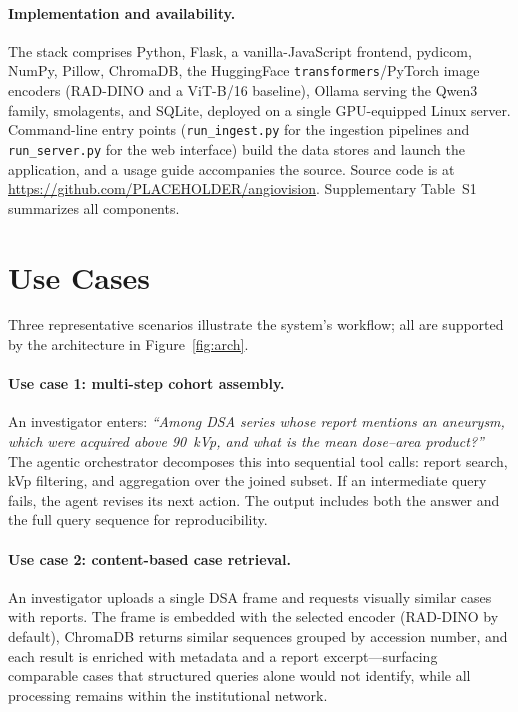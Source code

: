 \documentclass[11pt]{article}
\begin{document}
\paragraph{Implementation and availability.}
The stack comprises Python, Flask, a vanilla-JavaScript frontend, pydicom, NumPy, Pillow, ChromaDB, the HuggingFace
\texttt{transformers}/PyTorch image encoders (RAD-DINO and a ViT-B/16 baseline),
Ollama serving the Qwen3 family, smolagents, and SQLite, deployed on a single
GPU-equipped Linux server. Command-line entry points (\texttt{run\_ingest.py} for
the ingestion pipelines and \texttt{run\_server.py} for the web interface) build
the data stores and launch the application, and a usage guide accompanies the
source. Source code is at \url{https://github.com/PLACEHOLDER/angiovision}.
Supplementary Table~S1 summarizes all components.

\section{Use Cases}

Three representative scenarios illustrate the system's workflow; all are
supported by the architecture in Figure~\ref{fig:arch}.

\paragraph{Use case 1: multi-step cohort assembly.}
An investigator enters: \emph{``Among DSA series whose report mentions an
aneurysm, which were acquired above 90~kVp, and what is the mean dose--area
product?''} The agentic orchestrator decomposes this into sequential tool calls:
report search, kVp filtering, and aggregation over the joined subset. If an
intermediate query fails, the agent revises its next action. The output includes
both the answer and the full query sequence for reproducibility.

\paragraph{Use case 2: content-based case retrieval.}
An investigator uploads a single DSA frame and requests visually similar cases
with reports. The frame is embedded with the selected encoder (RAD-DINO by
default), ChromaDB returns similar sequences grouped by accession number, and
each result is enriched with metadata
and a report excerpt---surfacing comparable cases that structured queries alone
would not identify, while all processing remains within the institutional
network.
\end{document}
